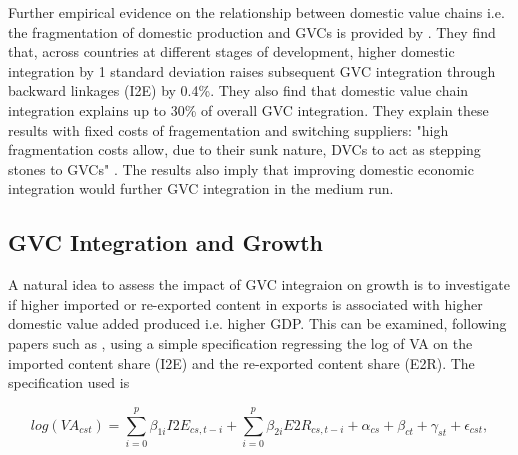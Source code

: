 \documentclass[a4paper]{article}
\begin{document}



Further empirical evidence on the relationship between domestic value chains i.e. the fragmentation of domestic production and GVCs is provided by \citet{beverelli2019domestic}. They find that, across countries at different stages of development, higher domestic integration by 1 standard deviation raises subsequent GVC integration through backward linkages (I2E) by 0.4\%. They also find that domestic value chain integration explains up to 30\% of overall GVC integration. They explain these results with fixed costs of fragementation and switching suppliers: "high fragmentation costs allow, due to their sunk nature, DVCs to act as stepping stones to GVCs" \citep{beverelli2019domestic}. The results also imply that improving domestic economic integration would further GVC integration in the medium run. 

\subsection{GVC Integration and  Growth}

A natural idea to assess the impact of GVC integraion on growth is to investigate if higher imported or re-exported content in exports is associated with higher domestic value added produced i.e. higher GDP. This can be examined, following papers such as \citet{kummritz2015global}, using a simple specification regressing the log of VA on the imported content share (I2E) and the re-exported content share (E2R). The specification used is

\begin{equation} \label{eq:GROWTH_HDFE}
log(VA_{cst}) = \sum_{i=0}^p \beta_{1i} I2E_{cs,t-i} + \sum_{i = 0}^p \beta_{2i} E2R_{cs,t-i}  + \alpha_{cs} + \beta_{ct} +\gamma_{st} + \epsilon_{cst},
\end{equation}
\end{document}
